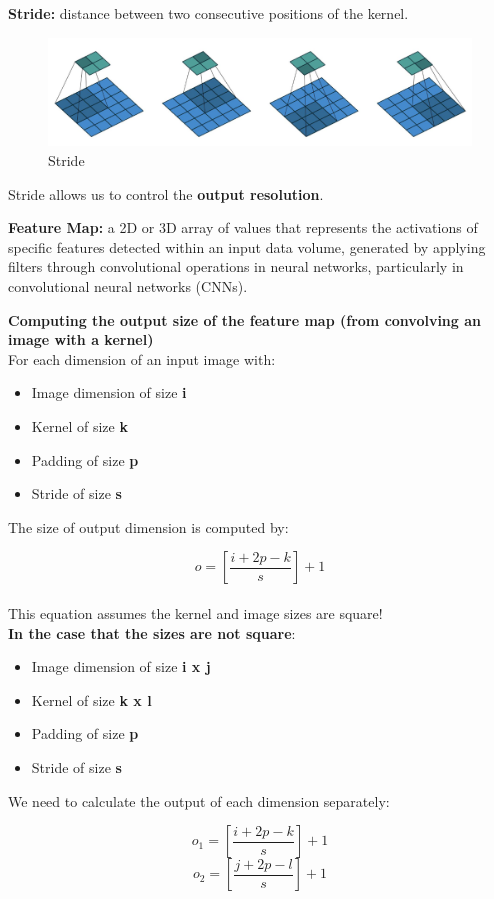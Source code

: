 \begin{definition}
    \textbf{Stride:}  distance between two consecutive positions of the kernel.
\end{definition}

\begin{figure}[h!t]
    \centering
    \includegraphics[width=0.75\linewidth]{stride.png}
    \caption{Stride}
    \label{fig:enter-label}
\end{figure}

Stride allows us to control the \textbf{output resolution}.

\begin{definition}
    \textbf{Feature Map:} a 2D or 3D array of values that represents the activations of specific features detected within an input data volume, generated by applying filters through convolutional operations in neural networks, particularly in convolutional neural networks (CNNs).
\end{definition}

\begin{theorem}
    \textbf{Computing the output size of the feature map (from convolving an image with a kernel)}\\

For each dimension of an input image with:
\begin{itemize}
    \item Image dimension of size \textbf{i}
    \item Kernel of size \textbf{k}
    \item Padding of size \textbf{p}
    \item Stride of size \textbf{s}
\end{itemize}
The size of output dimension is computed by:


\[o = [\frac{i + 2p - k}{s}] + 1\]
\\This equation assumes the kernel and image sizes are square!\\

\textbf{In the case that the sizes are not square}: 
    \begin{itemize}
        \item Image dimension of size \textbf{i x j}
        \item Kernel of size \textbf{k x l}
        \item Padding of size \textbf{p}
        \item Stride of size \textbf{s}
    \end{itemize}

We need to calculate the output of each dimension separately:

\[o_1 = [\frac{i + 2p - k}{s}] + 1\]
\[o_2 = [\frac{j + 2p - l}{s}] + 1\]
\end{theorem}

